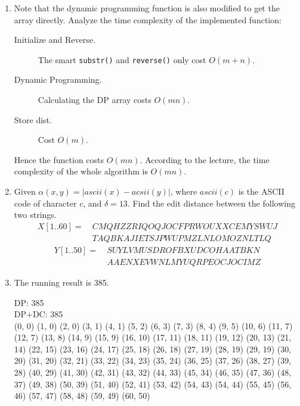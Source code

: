 \documentclass[12pt,a4paper]{article}
\makeatletter
\newtheorem*{solution}{Solution}
\theoremstyle{definition}
\renewenvironment{solution}[1][Solution] {\par\pushQED{\qed}\normalfont\topsep6\p@\@plus6\p@\relax\trivlist\item[\hskip\labelsep\bfseries#1\@addpunct{.}]\ignorespaces}{\popQED\endtrivlist\@endpefalse} \makeatother
\makeatother
\begin{document}
\begin{enumerate}
\begin{enumerate}
\begin{solution}
      Note that the dynamic programming function is also modified to get the array directly. Analyze the time complexity of the implemented function:
      \begin{description}
        \item[Initialize and Reverse.] The smart \texttt{substr()} and \texttt{reverse()} only cost $O(m+n)$.
        \item[Dynamic Programming.] Calculating the DP array costs $O(mn)$.
        \item[Store dist.] Cost $O(m)$.
      \end{description}
      Hence the function costs $O(mn)$. According to the lecture, the time complexity of the whole algorithm is $O(mn)$.
      \end{solution}
    	\item
    	Given $\alpha(x, y) = |ascii(x) - acsii(y)|$, where $ascii(c)$ is the ASCII code of character $c$, and $\delta=13$. Find the edit distance between the following two strings.
    	\begin{align*}
    		X[1..60]=&\ CMQHZZRIQOQJOCFPRWOUXXCEMYSWUJ\\
    		&\ TAQBKAJIETSJPWUPMZLNLOMOZNLTLQ	
    	\end{align*}
    	\begin{align*}
    		Y[1..50]=&\ SUYLVMUSDROFBXUDCOHAATBKN\\
    		&\ AAENXEVWNLMYUQRPEOCJOCIMZ
    	\end{align*}

      \begin{solution}
        The running result is 385.
        \begin{tcolorbox}
DP:     385\\
DP+DC:  385\\
(0, 0)
(1, 0)
(2, 0)
(3, 1)
(4, 1)
(5, 2)
(6, 3)
(7, 3)
(8, 4)
(9, 5)
(10, 6)
(11, 7)
(12, 7)
(13, 8)
(14, 9)
(15, 9)
(16, 10)
(17, 11)
(18, 11)
(19, 12) 
(20, 13)
(21, 14)
(22, 15)
(23, 16)
(24, 17)
(25, 18)
(26, 18)
(27, 19)
(28, 19)
(29, 19)
(30, 20)
(31, 20) 
(32, 21)
(33, 22)
(34, 23)
(35, 24)
(36, 25)
(37, 26)
(38, 27)
(39, 28)
(40, 29)
(41, 30)
(42, 31)
(43, 32)
(44, 33) 
(45, 34)
(46, 35)
(47, 36)
(48, 37)
(49, 38)
(50, 39)
(51, 40)
(52, 41)
(53, 42)
(54, 43) (54, 44)
(55, 45)
(56, 46)
(57, 47)
(58, 48)
(59, 49)
(60, 50)
        \end{tcolorbox}
      \end{solution}

    \end{enumerate}
    

\end{enumerate}
\end{document}
